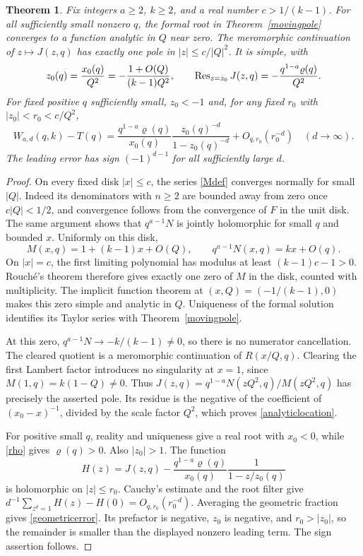 \documentclass[11pt]{amsart}
\newtheorem{theorem}{Theorem}[section]
\theoremstyle{definition}
\theoremstyle{remark}
\numberwithin{equation}{section}
\begin{document}
\begin{theorem}\label{analyticpole}
Fix integers $a\ge2$, $k\ge2$, and a real number $c>1/(k-1)$. For all sufficiently small nonzero $q$, the formal root in Theorem~\ref{movingpole} converges to a function analytic in $Q$ near zero. The meromorphic continuation of $z\mapsto J(z,q)$ has exactly one pole in $|z|\le c/|Q|^2$. It is simple, with
\begin{equation}\label{analyticlocation}
 z_0(q)=\frac{x_0(q)}{Q^2}
       =-\frac{1+O(Q)}{(k-1)Q^2},\qquad
 \operatorname{Res}_{z=z_0}J(z,q)=-\frac{q^{1-a}\varrho(q)}{Q^2}.
\end{equation}
For fixed positive $q$ sufficiently small, $z_0<-1$ and, for any fixed $r_0$ with $|z_0|<r_0<c/Q^2$,
\begin{equation}\label{geometricerror}
 W_{a,d}(q,k)-T(q)
 =\frac{q^{1-a}\varrho(q)}{x_0(q)}
          \frac{z_0(q)^{-d}}{1-z_0(q)^{-d}}+O_{q,r_0}(r_0^{-d})
 \quad(d\to\infty).
\end{equation}
The leading error has sign $(-1)^{d-1}$ for all sufficiently large $d$.
\end{theorem}
\begin{proof}
On every fixed disk $|x|\le c$, the series \eqref{Mdef} converges normally for small $|Q|$. Indeed its denominators with $n\ge2$ are bounded away from zero once $c|Q|<1/2$, and convergence follows from the convergence of $F$ in the unit disk. The same argument shows that $q^{a-1}N$ is jointly holomorphic for small $q$ and bounded $x$. Uniformly on this disk,
\[
 M(x,q)=1+(k-1)x+O(Q),\qquad
 q^{a-1}N(x,q)=kx+O(q).
\]
On $|x|=c$, the first limiting polynomial has modulus at least $(k-1)c-1>0$. Rouch\'e's theorem therefore gives exactly one zero of $M$ in the disk, counted with multiplicity. The implicit function theorem at $(x,Q)=(-1/(k-1),0)$ makes this zero simple and analytic in $Q$. Uniqueness of the formal solution identifies its Taylor series with Theorem~\ref{movingpole}.

At this zero, $q^{a-1}N\to-k/(k-1)\ne0$, so there is no numerator cancellation. The cleared quotient is a meromorphic continuation of $R(x/Q,q)$. Clearing the first Lambert factor introduces no singularity at $x=1$, since $M(1,q)=k(1-Q)\ne0$. Thus $J(z,q)=q^{1-a}N(zQ^2,q)/M(zQ^2,q)$ has precisely the asserted pole. Its residue is the negative of the coefficient of $(x_0-x)^{-1}$, divided by the scale factor $Q^2$, which proves \eqref{analyticlocation}.

For positive small $q$, reality and uniqueness give a real root with $x_0<0$, while \eqref{rho} gives $\varrho(q)>0$. Also $|z_0|>1$. The function
\[
 H(z)=J(z,q)-\frac{q^{1-a}\varrho(q)}{x_0(q)}
                         \frac1{1-z/z_0(q)}
\]
is holomorphic on $|z|\le r_0$. Cauchy's estimate and the root filter give
$d^{-1}\sum_{z^d=1}H(z)-H(0)=O_{q,r_0}(r_0^{-d})$. Averaging the geometric fraction gives \eqref{geometricerror}. Its prefactor is negative, $z_0$ is negative, and $r_0>|z_0|$, so the remainder is smaller than the displayed nonzero leading term. The sign assertion follows.
\end{proof}
\end{document}
